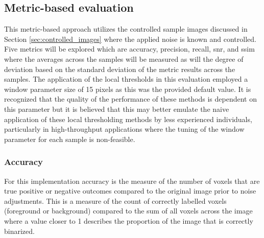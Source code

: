 \subsection{Metric-based evaluation}\label{sec:metrics_compare}
This metric-based approach utilizes the controlled sample images discussed in Section \ref{sec:controlled_images} where the applied noise is known and controlled. Five metrics will be explored which are accuracy, precision, recall, \gls{snr}, and \gls{ssim} where the averages across the samples will be measured as will the degree of deviation based on the standard deviation of the metric results across the samples. The application of the local thresholds in this evaluation employed a window parameter size of 15 pixels as this was the provided default value. It is recognized that the quality of the performance of these methods is dependent on this parameter but it is believed that this may better emulate the naive application of these local thresholding methods by less experienced individuals, particularly in high-throughput applications where the tuning of the window parameter for each sample is non-feasible.

\subsubsection{Accuracy}
For this implementation accuracy is the measure of the number of voxels that are true positive or negative outcomes compared to the original image prior to noise adjustments. This is a measure of the count of correctly labelled voxels (foreground or background) compared to the sum of all voxels across the image where a value closer to 1 describes the proportion of the image that is correctly binarized.

